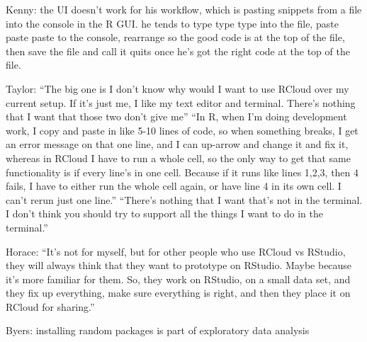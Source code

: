 Kenny: the UI doesn't work for his workflow, which is pasting snippets from a
file into the console in the R GUI.  he tends to type type type into the file,
paste paste paste to the console, rearrange so the good code is at the top of
the file, then save the file and call it quits once he's got the right code at
the top of the file.

Taylor: ``The big one is I don't know why would I want to use RCloud over my
current setup. If it's just me, I like my text editor and terminal. There's
nothing that I want that those two don't give me'' ``In R, when I'm doing
development work, I copy and paste in like 5-10 lines of code, so when something
breaks, I get an error message on that one line, and I can up-arrow and change
it and fix it, whereas in RCloud I have to run a whole cell, so the only way to
get that same functionality is if every line's in one cell. Because if it runs
like lines 1,2,3, then 4 fails, I have to either run the whole cell again, or
have line 4 in its own cell. I can't rerun just one line.'' ``There's nothing
that I want that's not in the terminal. I don't think you should try to support
all the things I want to do in the terminal.''

Horace: ``It's not for myself, but for other people who use RCloud vs RStudio,
they will always think that they want to prototype on RStudio. Maybe because
it's more familiar for them. So, they work on RStudio, on a small data set, and
they fix up everything, make sure everything is right, and then they place it on
RCloud for sharing.''

Byers: installing random packages is part of exploratory data analysis


